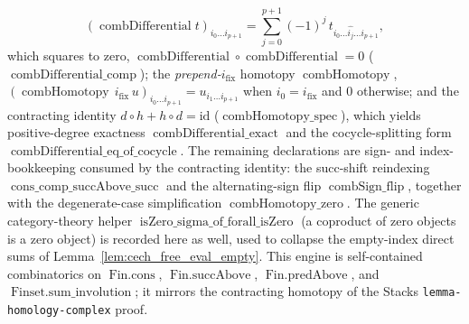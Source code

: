 \begin{lemma}
  \[
    (\operatorname{combDifferential} t)_{i_0 \ldots i_{p+1}}
      = \sum_{j=0}^{p+1} (-1)^j\, t_{i_0 \ldots \widehat{i_j} \ldots i_{p+1}},
  \]
  which squares to zero, \(\operatorname{combDifferential} \circ
  \operatorname{combDifferential} = 0\) (\(\operatorname{combDifferential\_comp}\)); the
  \emph{prepend-\(i_{\mathrm{fix}}\)} homotopy \(\operatorname{combHomotopy}\),
  \((\operatorname{combHomotopy}\, i_{\mathrm{fix}}\, u)_{i_0 \ldots i_{p+1}}
  = u_{i_1 \ldots i_{p+1}}\) when \(i_0 = i_{\mathrm{fix}}\) and \(0\) otherwise; and
  the contracting identity \(d \circ h + h \circ d = \mathrm{id}\)
  (\(\operatorname{combHomotopy\_spec}\)), which yields positive-degree exactness
  \(\operatorname{combDifferential\_exact}\) and the cocycle-splitting form
  \(\operatorname{combDifferential\_eq\_of\_cocycle}\). The remaining declarations are
  sign- and index-bookkeeping consumed by the contracting identity: the
  succ-shift reindexing \(\operatorname{cons\_comp\_succAbove\_succ}\) and the
  alternating-sign flip \(\operatorname{combSign\_flip}\), together with the
  degenerate-case simplification \(\operatorname{combHomotopy\_zero}\). The generic
  category-theory helper \(\operatorname{isZero\_sigma\_of\_forall\_isZero}\) (a
  coproduct of zero objects is a zero object) is recorded here as well, used to collapse
  the empty-index direct sums of Lemma~\ref{lem:cech_free_eval_empty}. This engine is
  self-contained combinatorics on \(\operatorname{Fin.cons}\),
  \(\operatorname{Fin.succAbove}\), \(\operatorname{Fin.predAbove}\), and
  \(\operatorname{Finset.sum\_involution}\); it mirrors the contracting homotopy of the
  Stacks \texttt{lemma-homology-complex} proof.
\end{lemma}

